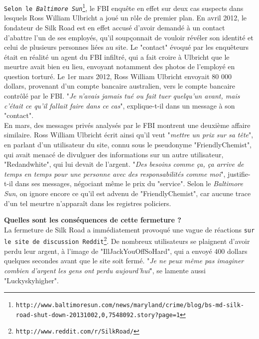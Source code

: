 \documentclass[11pt,twoside,a4paper]{article}
\begin{document}
\texttt{Selon le \emph{Baltimore Sun}\footnote{\texttt{http://www.baltimoresun.com/news/maryland/crime/blog/bs-md-silk-road-shut-down-20131002,0,7548092.story?page=1}}}, le FBI enqu{\^e}te en effet sur deux cas suspects dans lesquels Ross William Ulbricht a jou{\'e} un r{\^o}le de premier plan. En avril 2012, le fondateur de Silk Road est en effet accus{\'e} d'avoir demand{\'e} {\`a} un contact d'abattre l'un de ses employ{\'e}s, qu'il soup\c{c}onnait de vouloir r{\'e}v{\'e}ler son identit{\'e} et celui de plusieurs personnes li{\'e}es au site. Le "contact" {\'e}voqu{\'e} par les enqu{\^e}teurs {\'e}tait en r{\'e}alit{\'e} un agent du FBI infiltr{\'e}, qui a fait croire {\`a} Ulbricht que le meurtre avait bien eu lieu, envoyant notamment des photos de l'employ{\'e} en question tortur{\'e}. Le 1er mars 2012, Ross William Ulbricht envoyait 80 000 dollars, provenant d'un compte bancaire australien, vers le compte bancaire contr{\^o}l{\'e} par le FBI. "\emph{Je n'avais jamais tu{\'e} ou fait tuer quelqu'un avant, mais c'{\'e}tait ce qu'il fallait faire dans ce cas}", explique-t-il dans un message {\`a} son "contact". ~\\

En mars, des messages priv{\'e}s analys{\'e}s par le FBI montrent une deuxi{\`e}me affaire similaire. Ross William Ulbricht {\'e}crit ainsi qu'il veut "\emph{mettre un prix sur sa t{\^e}te}", en parlant d'un utilisateur du site, connu sous le pseudonyme "FriendlyChemist", qui avait menac{\'e} de divulguer des informations sur un autre utilisateur, "Redandwhite", qui lui devait de l'argent. "\emph{Des besoins comme \c{c}a, \c{c}a arrive de temps en temps pour une personne avec des responsabilit{\'e}s comme moi}", justifie-t-il dans ses messages, n{\'e}gociant m{\^e}me le prix du "service". Selon le \emph{Baltimore Sun}, on ignore encore ce qu'il est advenu de "FriendlyChemist", car aucune trace d'un tel meurtre n'appara{\^i}t dans les registres policiers. ~\\

\clearpage

	\textbf{Quelles sont les cons{\'e}quences de cette fermeture ?}~\\

La fermeture de Silk Road a imm{\'e}diatement provoqu{\'e} une vague de r{\'e}actions \texttt{sur le site de discussion Reddit\footnote{\texttt{http://www.reddit.com/r/SilkRoad/}}}. De nombreux utilisateurs se plaignent d'avoir perdu leur argent, {\`a} l'image de "IllJackYouOffSoHard", qui a envoy{\'e} 400 dollars quelques secondes avant que le site soit ferm{\'e}. "\emph{Je ne peux m{\^e}me pas imaginer combien d'argent les gens ont perdu aujourd'hui}", se lamente aussi "Luckyskyhigher". ~\\
\end{document}
